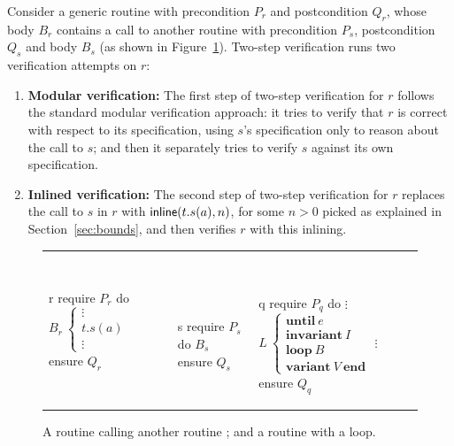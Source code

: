 Consider a generic routine  with precondition $P_r$ and postcondition $Q_r$, whose body $B_r$ contains a call  to another routine  with precondition $P_s$, postcondition $Q_s$ and body $B_s$ (as shown in Figure~\ref{r-calls-s}).
Two-step verification runs two verification attempts on $r$:
\begin{enumerate}
\item \textbf{Modular verification:} The first step of two-step verification for $r$ follows the standard modular verification approach: it tries to verify that $r$ is correct with respect to its specification, using $s$'s specification only to reason about the call to $s$; and then it separately tries to verify $s$ against its own specification.

\item \textbf{Inlined verification:} The second step of two-step verification for $r$ replaces the call to $s$ in $r$ with $\mathsf{inline}(t.s(a), n)$, for some $n > 0$ picked as explained in Section~\ref{sec:bounds}, and then verifies $r$ with this inlining.
\end{enumerate}

\begin{figure}[!tbh]
\centering
\begin{tabular}{lll}
{\begin{erunning}
r
  require $P_r$
  do
    $B_r \ \left\{\begin{array}{c}
        \vdots \\
        t.s (a)  \\
        \vdots
     \end{array}\right.
     $
   ensure $Q_r$
\end{erunning}}
&
$\qquad\quad$
{\begin{erunning}
s
  require $P_s$
  do
    $B_s$
  ensure $Q_s$
\end{erunning}}
&
$\qquad$
{\begin{erunning}
q
  require $P_q$
  do
    $\vdots$
    $L \ \left\{ \begin{array}{l}
    \textbf{until} \ e \\
    \textbf{invariant} \ I \\
    \textbf{loop} \ B \\
    \textbf{variant} \ V\ \textbf{end}
    \end{array} \right. $
    $\vdots$
  ensure $Q_q$
\end{erunning}}
\end{tabular}
\caption{A routine  calling another routine ; and a routine  with a loop.} \label{r-calls-s}
\end{figure}

